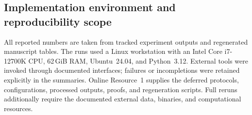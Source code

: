 \subsection{Implementation environment and reproducibility scope}

All reported numbers are taken from tracked experiment outputs and regenerated manuscript tables. The runs used a Linux workstation with an Intel Core i7-12700K CPU, 62\,GiB RAM, Ubuntu~24.04, and Python~3.12. External tools were invoked through documented interfaces; failures or incompletions were retained explicitly in the summaries. Online Resource~1 supplies the deferred protocols, configurations, processed outputs, proofs, and regeneration scripts. Full reruns additionally require the documented external data, binaries, and computational resources.


